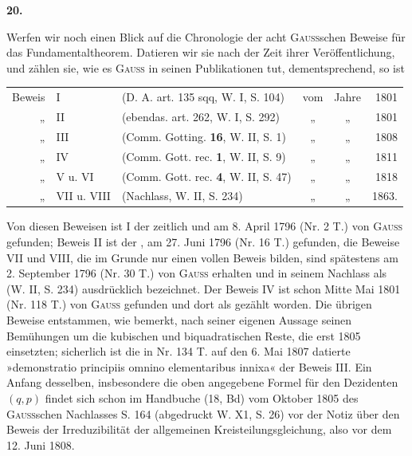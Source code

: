 \newpage{}
\begin{center}\bfseries 20.\end{center}
\noindent\hspace*{\parindent}Werfen wir noch einen Blick auf die Chronologie der acht \textsc{Gauss}schen Beweise für das Fundamentaltheorem. Datieren wir sie nach der Zeit ihrer Veröffentlichung, und zählen sie, wie es \textsc{Gauss} in seinen Publikationen tut, dementsprechend, so ist
\begin{center}\small\setlength{\tabcolsep}{3pt}
\begin{tabular}{@{}rllccr@{}}
Beweis & I & (D. A. art. 135 sqq, W. I, S. 104) & vom & Jahre & 1801\\
„ & II & (ebendas. art. 262, W. I, S. 292) & „ & „ & 1801\\
„ & III & (Comm. Gotting. \textbf{16}, W. II, S. 1) & „ & „ & 1808\\
„ & IV & (Comm. Gott. rec. \textbf{1}, W. II, S. 9) & „ & „ & 1811\\
„ & V u. VI & (Comm. Gott. rec. \textbf{4}, W. II, S. 47) & „ & „ & 1818\\
„ & VII u. VIII & (Nachlass, W. II, S. 234) & „ & „ & 1863.
\end{tabular}\end{center}
\noindent Von diesen Beweisen ist I der zeitlich  und am 8. April 1796 (Nr. 2 T.) von \textsc{Gauss} gefunden; Beweis II ist der , am 27. Juni 1796 (Nr. 16 T.) gefunden, die Beweise VII und VIII, die im Grunde nur einen vollen Beweis bilden, sind spätestens am 2. September 1796 (Nr. 30 T.) von \textsc{Gauss} erhalten und in seinem Nachlass als  (W. II, S. 234) ausdrücklich bezeichnet. Der Beweis IV ist schon Mitte Mai 1801 (Nr. 118 T.) von \textsc{Gauss} gefunden und dort als  gezählt worden. Die übrigen Beweise entstammen, wie bemerkt, nach seiner eigenen Aussage seinen Bemühungen um die kubischen und biquadratischen Reste, die erst 1805 einsetzten; sicherlich ist die in Nr. 134 T. auf den 6. Mai 1807 datierte »demonstratio principiis omnino elementaribus innixa« der Beweis III. Ein Anfang desselben, insbesondere die oben angegebene Formel für den Dezidenten \((q,p)\) findet sich schon im Handbuche (18, Bd) vom Oktober 1805 des \textsc{Gauss}schen Nachlasses S. 164 (abgedruckt W. X1, S. 26) vor der Notiz über den Beweis der Irreduzibilität der allgemeinen Kreisteilungsgleichung, also vor dem 12. Juni 1808.

